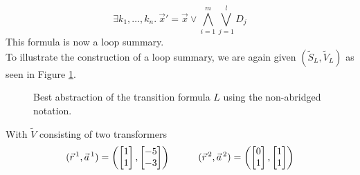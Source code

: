\begin{equation*}
	\exists k_1, \ldots, k_n.\ \vec{x}' = \vec{x} \lor \bigwedge_{i=1}^{m} \bigvee_{j=1}^l D_j 
\end{equation*}
This formula is now a loop summary. \\
To illustrate the construction of a loop summary, we are again given $(\tilde{S}_L, \tilde{V}_L)$ as seen in Figure \ref{nonabbridged}.
\begin{figure}[H]
	\centering
	
	\caption{Best \qvasr abstraction of the transition formula $L$ using the non-abridged notation.}
	\label{nonabbridged}
\end{figure}

 With $\tilde{V}$ consisting of two transformers
\begin{align*}
	(\vec{r}^{\, 1}, \vec{a}^{\, 1}) = 		
	\begin{pmatrix}
		\begin{bmatrix}
			1 \\
			1 
		\end{bmatrix},
		\begin{bmatrix}
			-5 \\
			-3 
		\end{bmatrix}
	\end{pmatrix} \hspace*{1cm}
	(\vec{r}^{\, 2}, \vec{a}^{\, 2}) = 		
	\begin{pmatrix}
		\begin{bmatrix}
			0 \\
			1 
		\end{bmatrix},
		\begin{bmatrix}
			1 \\
			1 
		\end{bmatrix}
	\end{pmatrix}
\end{align*}


